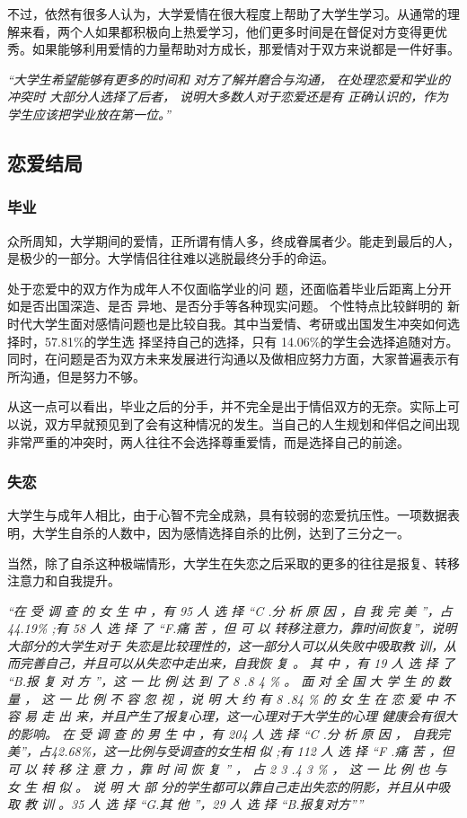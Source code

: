\documentclass[UTF8,a4paper]{ctexart}
\begin{document}
不过，依然有很多人认为，大学爱情在很大程度上帮助了大学生学习。从通常的理解来看，两个人如果都积极向上热爱学习，他们更多时间是在督促对方变得更优秀。如果能够利用爱情的力量帮助对方成长，那爱情对于双方来说都是一件好事。

\textit{
“大学生希望能够有更多的时间和 对方了解并磨合与沟通， 在处理恋爱和学业的冲突时 大部分人选择了后者， 说明大多数人对于恋爱还是有 正确认识的，作为学生应该把学业放在第一位。”}

\subsection{恋爱结局}

\subsubsection{毕业}

众所周知，大学期间的爱情，正所谓有情人多，终成眷属者少。能走到最后的人，是极少的一部分。大学情侣往往难以逃脱最终分手的命运。

处于恋爱中的双方作为成年人不仅面临学业的问 题，还面临着毕业后距离上分开如是否出国深造、是否 异地、是否分手等各种现实问题。 个性特点比较鲜明的 新时代大学生面对感情问题也是比较自我。其中当爱情、考研或出国发生冲突如何选择时，57.81\%的学生选 择坚持自己的选择，只有 14.06\%的学生会选择追随对方。 同时，在问题是否为双方未来发展进行沟通以及做相应努力方面，大家普遍表示有所沟通，但是努力不够。

从这一点可以看出，毕业之后的分手，并不完全是出于情侣双方的无奈。实际上可以说，双方早就预见到了会有这种情况的发生。当自己的人生规划和伴侣之间出现非常严重的冲突时，两人往往不会选择尊重爱情，而是选择自己的前途。

\subsubsection{失恋}
大学生与成年人相比，由于心智不完全成熟，具有较弱的恋爱抗压性。一项数据表明，大学生自杀的人数中，因为感情选择自杀的比例，达到了三分之一。

当然，除了自杀这种极端情形，大学生在失恋之后采取的更多的往往是报复、转移注意力和自我提升。

\textit{
“在 受 调 查 的 女 生 中 ，有 95 人 选 择 “C .分 析 原 因 ，自 我 完 美 ”，占 44.19\% ;有 58 人 选 择 了 “F.痛 苦 ，但 可 以 转移注意力，靠时间恢复”，说明大部分的大学生对于 失恋是比较理性的，这一部分人可以从失败中吸取教 训，从而完善自己，并且可以从失恋中走出来，自我恢 复 。 其 中 ，有 19 人 选 择 了 “B.报 复 对 方 ”，这 一 比 例 达 到 了 8 .8 4 \% 。 面 对 全 国 大 学 生 的 数 量 ， 这 一 比 例 不 容 忽 视 ，说 明 大 约 有 8 .84 \% 的 女 生 在 恋 爱 中 不 容 易 走 出 来，并且产生了报复心理，这一心理对于大学生的心理 健康会有很大的影响。
在 受 调 查 的 男 生 中 ，有 204 人 选 择 “C .分 析 原 因 ， 自我完美”，占42.68\%，这一比例与受调查的女生相 似 ;有 112 人 选 择 “F .痛 苦 ，但 可 以 转 移 注 意 力 ，靠 时 间 恢 复 ” ， 占 2 3 .4 3 \% ， 这 一 比 例 也 与 女 生 相 似 。 说 明 大 部 分的学生都可以靠自己走出失恋的阴影，并且从中吸 取 教 训 。35 人 选 择 “G.其 他 ”，29 人 选 择 “B.报复对方””}
\end{document}
